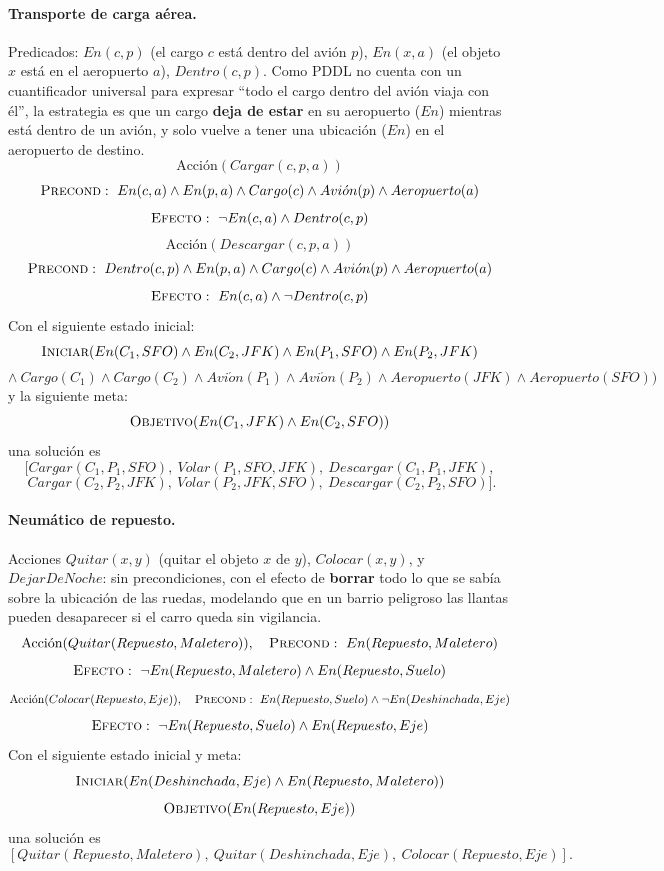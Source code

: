 \paragraph{Transporte de carga aérea.} Predicados: $En(c,p)$ (el cargo $c$ está dentro del avión
$p$), $En(x,a)$ (el objeto $x$ está en el aeropuerto $a$), $Dentro(c,p)$. Como PDDL no cuenta con un
cuantificador universal para expresar ``todo el cargo dentro del avión viaja con él'', la estrategia
es que un cargo \textbf{deja de estar} en su aeropuerto ($En$) mientras está dentro de un avión, y
solo vuelve a tener una ubicación ($En$) en el aeropuerto de destino.
\[
    \text{Acci\'on}(Cargar(c,p,a))
\]
\[
    \textsc{Precond}:\ En(c,a)\land En(p,a)\land Cargo(c)\land Avi\acute{o}n(p)\land Aeropuerto(a)
\]
\[
    \textsc{Efecto}:\ \neg En(c,a)\land Dentro(c,p)
\]
\[
    \text{Acci\'on}(Descargar(c,p,a))
\]
\[
    \textsc{Precond}:\ Dentro(c,p)\land En(p,a)\land Cargo(c)\land Avi\acute{o}n(p)\land
    Aeropuerto(a)
\]
\[
    \textsc{Efecto}:\ En(c,a)\land \neg Dentro(c,p)
\]
Con el siguiente estado inicial:
\[
    \textsc{Iniciar}(En(C_1,SFO)\land En(C_2,JFK)\land En(P_1,SFO)\land En(P_2,JFK)
\]
\[
    \land\ Cargo(C_1)\land Cargo(C_2)\land Avi\acute{o}n(P_1)\land Avi\acute{o}n(P_2)\land
    Aeropuerto(JFK)\land Aeropuerto(SFO))
\]
y la siguiente meta:
\[
    \textsc{Objetivo}(En(C_1,JFK)\land En(C_2,SFO))
\]
una solución es
\[
    [Cargar(C_1,P_1,SFO),\ Volar(P_1,SFO,JFK),\ Descargar(C_1,P_1,JFK),
\]
\[
    \phantom{[}Cargar(C_2,P_2,JFK),\ Volar(P_2,JFK,SFO),\ Descargar(C_2,P_2,SFO)].
\]

\paragraph{Neumático de repuesto.} Acciones $Quitar(x,y)$ (quitar el objeto $x$ de $y$),
$Colocar(x,y)$, y $DejarDeNoche$: sin precondiciones, con el efecto de \textbf{borrar} todo lo que se
sabía sobre la ubicación de las ruedas, modelando que en un barrio peligroso las llantas pueden
desaparecer si el carro queda sin vigilancia.
\[
    \text{Acci\'on}(Quitar(Repuesto,Maletero)),\quad \textsc{Precond}:\ En(Repuesto,Maletero)
\]
\[
    \textsc{Efecto}:\ \neg En(Repuesto,Maletero)\land En(Repuesto,Suelo)
\]
\[
    \text{Acci\'on}(Colocar(Repuesto,Eje)),\quad \textsc{Precond}:\ En(Repuesto,Suelo)\land
    \neg En(Deshinchada,Eje)
\]
\[
    \textsc{Efecto}:\ \neg En(Repuesto,Suelo)\land En(Repuesto,Eje)
\]
Con el siguiente estado inicial y meta:
\[
    \textsc{Iniciar}(En(Deshinchada,Eje)\land En(Repuesto,Maletero))
\]
\[
    \textsc{Objetivo}(En(Repuesto,Eje))
\]
una solución es
\[
    [Quitar(Repuesto,Maletero),\ Quitar(Deshinchada,Eje),\ Colocar(Repuesto,Eje)].
\]

